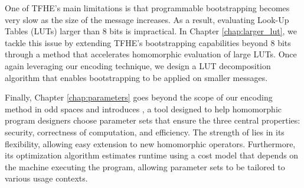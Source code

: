 One of TFHE’s main limitations is that programmable bootstrapping becomes very slow as the size of the message increases. As a result, evaluating Look-Up Tables (LUTs) larger than 8 bits is impractical. In Chapter \ref{chap:larger_lut}, we tackle this issue by extending TFHE’s bootstrapping capabilities beyond 8 bits through a method that accelerates homomorphic evaluation of large LUTs. Once again leveraging our encoding technique, we design a LUT decomposition algorithm that enables bootstrapping to be applied on smaller messages.

Finally, Chapter \ref{chap:parameters} goes beyond the scope of our encoding method in odd spaces and introduces \toolName, a tool designed to help homomorphic program designers choose parameter sets that ensure the three central properties: security, correctness of computation, and efficiency. The strength of \toolName lies in its flexibility, allowing easy extension to new homomorphic operators. Furthermore, its optimization algorithm estimates runtime using a cost model that depends on the machine executing the program, allowing parameter sets to be tailored to various usage contexts.
